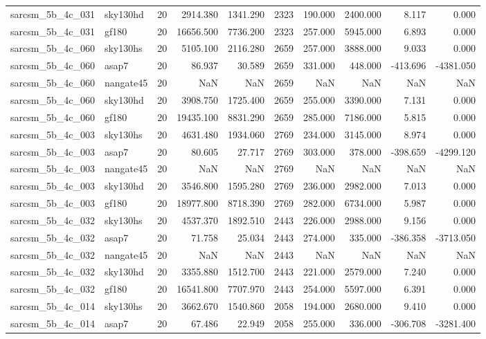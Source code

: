 \begin{longtable}{llrrrrrrrr}
sarcsm\_5b\_4c\_031 & sky130hd & 20 & 2914.380 & 1341.290 & 2323 & 190.000 & 2400.000 & 8.117 & 0.000 \\
sarcsm\_5b\_4c\_031 & gf180 & 20 & 16656.500 & 7736.200 & 2323 & 257.000 & 5945.000 & 6.893 & 0.000 \\
sarcsm\_5b\_4c\_060 & sky130hs & 20 & 5105.100 & 2116.280 & 2659 & 257.000 & 3888.000 & 9.033 & 0.000 \\
sarcsm\_5b\_4c\_060 & asap7 & 20 & 86.937 & 30.589 & 2659 & 331.000 & 448.000 & -413.696 & -4381.050 \\
sarcsm\_5b\_4c\_060 & nangate45 & 20 & NaN & NaN & 2659 & NaN & NaN & NaN & NaN \\
sarcsm\_5b\_4c\_060 & sky130hd & 20 & 3908.750 & 1725.400 & 2659 & 255.000 & 3390.000 & 7.131 & 0.000 \\
sarcsm\_5b\_4c\_060 & gf180 & 20 & 19435.100 & 8831.290 & 2659 & 285.000 & 7186.000 & 5.815 & 0.000 \\
sarcsm\_5b\_4c\_003 & sky130hs & 20 & 4631.480 & 1934.060 & 2769 & 234.000 & 3145.000 & 8.974 & 0.000 \\
sarcsm\_5b\_4c\_003 & asap7 & 20 & 80.605 & 27.717 & 2769 & 303.000 & 378.000 & -398.659 & -4299.120 \\
sarcsm\_5b\_4c\_003 & nangate45 & 20 & NaN & NaN & 2769 & NaN & NaN & NaN & NaN \\
sarcsm\_5b\_4c\_003 & sky130hd & 20 & 3546.800 & 1595.280 & 2769 & 236.000 & 2982.000 & 7.013 & 0.000 \\
sarcsm\_5b\_4c\_003 & gf180 & 20 & 18977.800 & 8718.390 & 2769 & 282.000 & 6734.000 & 5.987 & 0.000 \\
sarcsm\_5b\_4c\_032 & sky130hs & 20 & 4537.370 & 1892.510 & 2443 & 226.000 & 2988.000 & 9.156 & 0.000 \\
sarcsm\_5b\_4c\_032 & asap7 & 20 & 71.758 & 25.034 & 2443 & 274.000 & 335.000 & -386.358 & -3713.050 \\
sarcsm\_5b\_4c\_032 & nangate45 & 20 & NaN & NaN & 2443 & NaN & NaN & NaN & NaN \\
sarcsm\_5b\_4c\_032 & sky130hd & 20 & 3355.880 & 1512.700 & 2443 & 221.000 & 2579.000 & 7.240 & 0.000 \\
sarcsm\_5b\_4c\_032 & gf180 & 20 & 16541.800 & 7707.970 & 2443 & 254.000 & 5597.000 & 6.391 & 0.000 \\
sarcsm\_5b\_4c\_014 & sky130hs & 20 & 3662.670 & 1540.860 & 2058 & 194.000 & 2680.000 & 9.410 & 0.000 \\
sarcsm\_5b\_4c\_014 & asap7 & 20 & 67.486 & 22.949 & 2058 & 255.000 & 336.000 & -306.708 & -3281.400 \\

\end{longtable}
